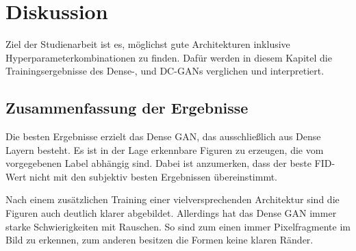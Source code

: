 
\chapter{Diskussion}
Ziel der Studienarbeit ist es, möglichst gute Architekturen inklusive Hyperparameterkombinationen zu finden.
Dafür werden in diesem Kapitel die Trainingsergebnisse des Dense-, und DC-GANs verglichen und interpretiert.

\section{Zusammenfassung der Ergebnisse}
Die besten Ergebnisse erzielt das Dense GAN, das ausschließlich aus Dense Layern besteht.
Es ist in der Lage erkennbare Figuren zu erzeugen, die vom vorgegebenen Label abhängig sind.
Dabei ist anzumerken, dass der beste FID-Wert nicht mit den subjektiv besten Ergebnissen übereinstimmt.
\newline

Nach einem zusätzlichen Training einer vielversprechenden Architektur sind die Figuren auch deutlich klarer abgebildet.
Allerdings hat das Dense GAN immer starke Schwierigkeiten mit Rauschen.
So sind zum einen immer Pixelfragmente im Bild zu erkennen, zum anderen besitzen die Formen keine klaren Ränder.


